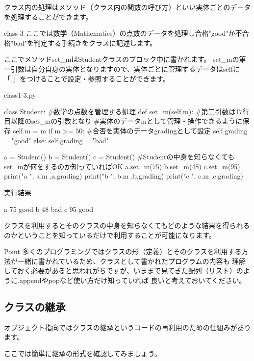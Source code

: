クラス内の処理はメソッド（クラス内の関数の呼び方）といい実体ごとのデータを処理することができます。
\newpage
\begin{pabox}{class-3}
ここでは数学（Mathematics）の点数のデータを処理し合格"good"か不合格"bad"を判定する手続きをクラスに記述します。

ここでメソッドset\_mはStudentクラスのブロック中に書かれます。
set\_mの第一引数は自分自身の実体となりますので、実体ごとに管理するデータはselfに「.」をつけることで設定・参照することができます。
\begin{legbox}{class1-3.py}
\begin{listing}{1}
class Student: 
    #数学の点数を管理する処理
    def set_m(self,m):
        #第二引数は17行目以降のset_mの引数となり
        #実体のデータmとして管理・操作できるように保存
        self.m = m
        if m >= 50:
            #合否を実体のデータgradingとして設定
            self.grading = "good"
        else:
            self.grading = "bad"

a = Student()
b = Student()
c = Student()
#Studentの中身を知らなくてもset_mが何をするのか知っていればOK
a.set_m(75)
b.set_m(48)
c.set_m(95)
print("a ", a.m ,a.grading)
print("b ", b.m ,b.grading)
print("c ", c.m ,c.grading)
\end{listing}
実行結果
\begin{listing}{1}
a  75 good
b  48 bad
c  95 good
\end{listing}
\end{legbox}

\end{pabox}

クラスを利用するとそのクラスの中身を知らなくてもどのような結果を得られるのかということを知っているだけで利用することが可能になります。
\begin{hipoint}{Point}
多くのプログラミングではクラスの形（定義）とそのクラスを利用する方法が一緒に書かれているため、クラスとして書かれたプログラムの内容も
理解しておく必要があると思われがちですが、いままで見てきた配列（リスト）のように.appendやpopなど使い方だけ知っていれば
良いと考えておいてください。
\end{hipoint}

\subsection{クラスの継承}
オブジェクト指向ではクラスの継承というコードの再利用のための仕組みがあります。

ここでは簡単に継承の形式を確認してみましょう。

